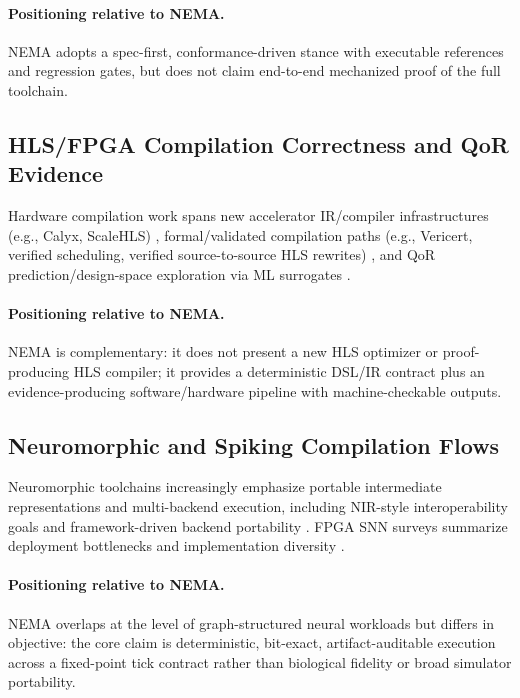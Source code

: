 \paragraph{Positioning relative to NEMA.}
NEMA adopts a spec-first, conformance-driven stance with executable references and regression gates, but does not claim end-to-end mechanized proof of the full toolchain.

\subsection{HLS/FPGA Compilation Correctness and QoR Evidence}

Hardware compilation work spans new accelerator IR/compiler infrastructures (e.g., Calyx, ScaleHLS) \cite{NigamASPLOS2021Calyx,YeDAC2022ScaleHLS,YeArxiv2107.11673}, formal/validated compilation paths (e.g., Vericert, verified scheduling, verified source-to-source HLS rewrites) \cite{HerklotzOOPSLA2021Vericert,HerklotzPLDI2024Hyperblock,PouchetFPGA2024HLSVerify}, and QoR prediction/design-space exploration via ML surrogates \cite{GoswamiIntegration2023MLDSE,GaoArxiv2401.08696,WangTODAES2022DSE}.

\paragraph{Positioning relative to NEMA.}
NEMA is complementary: it does not present a new HLS optimizer or proof-producing HLS compiler; it provides a deterministic DSL/IR contract plus an evidence-producing software/hardware pipeline with machine-checkable outputs.

\subsection{Neuromorphic and Spiking Compilation Flows}

Neuromorphic toolchains increasingly emphasize portable intermediate representations and multi-backend execution, including NIR-style interoperability goals and framework-driven backend portability \cite{PedersenNatComm2024NIR,PedersenArxiv2311.14641,DeWolfArxiv2007.10227}. FPGA SNN surveys summarize deployment bottlenecks and implementation diversity \cite{KaramimaneshNeuralNetworks2025SNNFPGA}.

\paragraph{Positioning relative to NEMA.}
NEMA overlaps at the level of graph-structured neural workloads but differs in objective: the core claim is deterministic, bit-exact, artifact-auditable execution across a fixed-point tick contract rather than biological fidelity or broad simulator portability.
